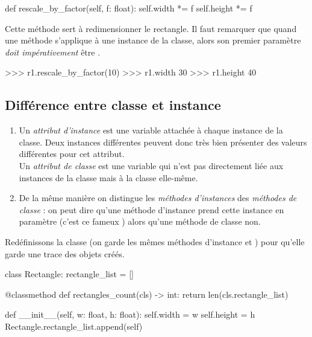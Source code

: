 \documentclass[a4paper,12pt,french]{book}
\begin{document}
    \begin{pythoncode}
def rescale_by_factor(self, f: float):
    self.width *= f
    self.height *= f
        \end{pythoncode}
    Cette méthode sert à redimensionner le rectangle. Il faut remarquer que quand une méthode s'applique à une instance de la classe, alors son premier paramètre \textit{doit impérativement} être .
    
    \begin{pythonshell}
>>> r1.rescale_by_factor(10)
>>> r1.width
30
>>> r1.height
40
        \end{pythonshell}
    
    \subsection{Différence entre classe et instance}
    
    \begin{definition}[s]
        \begin{enumerate}[--]
            \item     Un \textit{attribut d'instance} est une variable attachée à chaque instance de la classe. Deux instances différentes peuvent donc très bien présenter des valeurs différentes pour cet attribut.\\
            Un \textit{attribut de classe} est une variable qui n'est pas directement liée aux instances de la classe mais à la classe elle-même.
            \item     De la même manière on distingue les \textit{méthodes d'instances} des \textit{ méthodes de classe} : on peut dire qu'une méthode d'instance prend cette instance en paramètre (c'est ce fameux ) alors qu'une méthode de classe non.
        \end{enumerate}
    \end{definition}
    
    Redéfinissons la classe  (on garde les mêmes méthodes d'instance  et ) pour qu'elle garde une trace des objets créés.
    
    \begin{pythoncode}
class Rectangle:
    rectangle_list = []
    
    @classmethod
    def rectangles_count(cls) -> int:
        return len(cls.rectangle_list)
    
    def __init__(self, w: float, h: float):
        self.width = w
        self.height = h
        Rectangle.rectangle_list.append(self)
        \end{pythoncode}
    
\end{document}
